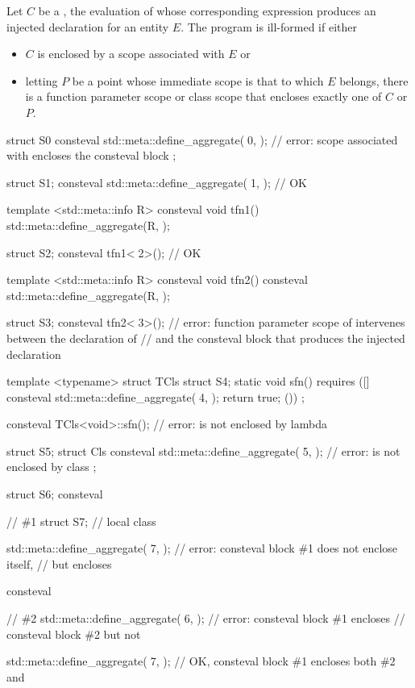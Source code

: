 \pnum
Let $C$ be a ,
the evaluation of whose corresponding expression
produces an injected declaration for an entity $E$.
The program is ill-formed if either
\begin{itemize}
\item
$C$ is enclosed by a scope associated with $E$ or
\item
letting $P$ be a point whose immediate scope is that to which $E$ belongs,
there is a function parameter scope or class scope
that encloses exactly one of $C$ or $P$.
\end{itemize}
\begin{example}
\begin{codeblock}
struct S0 {
  consteval {
    std::meta::define_aggregate(^^S0, {});  // error: scope associated with  encloses the consteval block
  }
};

struct S1;
consteval { std::meta::define_aggregate(^^S1, {}); }    // OK

template <std::meta::info R> consteval void tfn1() {
  std::meta::define_aggregate(R, {});
}

struct S2;
consteval { tfn1<^^S2>(); }                             // OK

template <std::meta::info R> consteval void tfn2() {
  consteval { std::meta::define_aggregate(R, {}); }
}

struct S3;
consteval { tfn2<^^S3>(); }
  // error: function parameter scope of  intervenes between the declaration of 
  // and the consteval block that produces the injected declaration

template <typename> struct TCls {
  struct S4;
  static void sfn() requires ([] {
    consteval { std::meta::define_aggregate(^^S4, {}); }
    return true;
  }()) { }
};

consteval { TCls<void>::sfn(); }    // error:  is not enclosed by  lambda

struct S5;
struct Cls {
  consteval { std::meta::define_aggregate(^^S5, {}); }  // error:  is not enclosed by class 
};

struct S6;
consteval {                                 // \#1
  struct S7;                                // local class

  std::meta::define_aggregate(^^S7, {});    // error: consteval block \#1 does not enclose itself,
                                            // but encloses 

  consteval {                               // \#2
    std::meta::define_aggregate(^^S6, {});  // error: consteval block \#1 encloses
                                            // consteval block \#2 but not 

    std::meta::define_aggregate(^^S7, {});  // OK, consteval block \#1 encloses both \#2 and 
  }
}
\end{codeblock}
\end{example}

